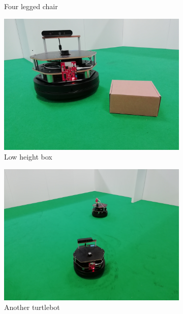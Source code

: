 \begin{figure}[h!]
\begin{subfigure}[b]{0.3\linewidth}
    \caption{Four legged chair}
    \label{fig::nchair}
  \end{subfigure}
  \begin{subfigure}[b]{0.3\linewidth}
    \includegraphics[width=\linewidth]{imgs/chapter5/box.jpg}
    \caption{Low height box}
    \label{fig::box}
  \end{subfigure}
  \begin{subfigure}[b]{0.3\linewidth}
    \includegraphics[width=\linewidth]{imgs/chapter5/robot.jpg}
    \caption{Another turtlebot}
    \label{fig::robot}
  \end{subfigure}
  \begin{subfigure}[b]{0.3\linewidth}

\end{subfigure}
\end{figure}
